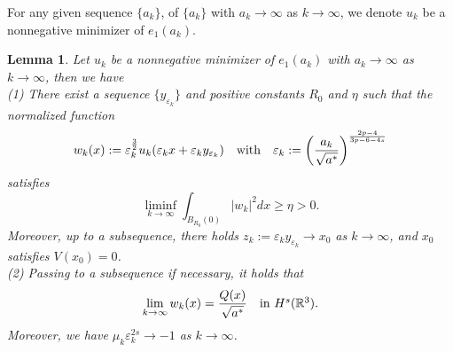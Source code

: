 \documentclass[reqno, 11pt]{amsart} %
\numberwithin{equation}{section}
\newtheorem{lemma}[theorem]{Lemma}
\begin{document}
	For any given sequence $\{a_{k}\}$, of $\{a_{k}\}$ with $a_{k}\rightarrow\infty$ as $k\rightarrow\infty$, we denote $u_{k}$ be a nonnegative minimizer of $e_{1}(a_{k})$.
	\begin{lemma}\label{lem3-2}
		Let $u_{k}$ be a nonnegative minimizer of $e_{1}(a_{k})$ with $a_{k}\rightarrow\infty$ as $k\rightarrow\infty$, then we have\\
		(1) There exist a sequence $\{y_{\varepsilon_{k}}\}$ and positive constants $R_{0}$ and $\eta$ such that the normalized function
		\begin{equation}\label{equ3-14}
			w_{k}(x):=\varepsilon_{k}^{\frac{3}{2}}u_{k}(\varepsilon_{k}x+\varepsilon_{k}y_{\varepsilon_{k}})\quad \hbox{with}\quad \varepsilon_{k}:=\left(\frac{a_{k}}{\sqrt{a^{\ast}}}\right)^{\frac{2p-4}{3p-6-4s}}
		\end{equation}
		satisfies
		\begin{equation}\label{equ3-15}
			\liminf\limits_{k\rightarrow\infty}\int_{B_{R_{0}}(0)}|w_{k}|^{2}dx\geq\eta>0.
		\end{equation}
		Moreover, up to a subsequence, there holds $z_{k}:=\varepsilon_{k}y_{\varepsilon_{k}}\rightarrow x_{0}$ as $k\rightarrow\infty$, and $x_{0}$ satisfies $V(x_{0})=0$.\\
		(2) Passing to a subsequence if necessary, it holds that
		\begin{equation}\label{equ3-16}
			\lim_{k\rightarrow\infty}w_{k}(x)=\frac{Q(x)}{\sqrt{a^{\ast}}}\quad \hbox{in $H^{s}(\mathbb{R}^{3})$}.
		\end{equation}
		Moreover, we have $\mu_{k}\varepsilon_{k}^{2s}\rightarrow-1$ as $k\rightarrow\infty$.
	\end{lemma}
\end{document}
